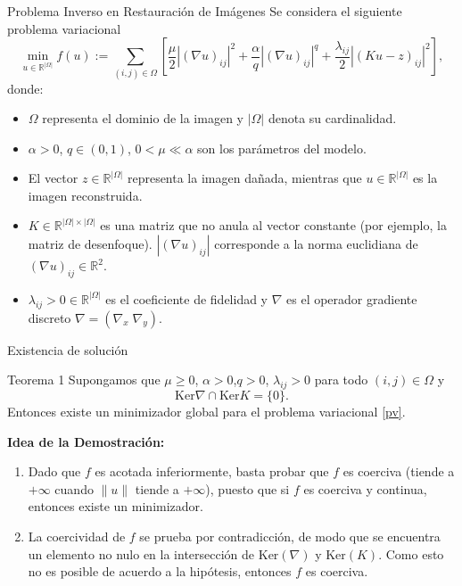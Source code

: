 \documentclass[aspectratio=169,11pt]{beamer}
\begin{document}
\begin{frame}{Problema Inverso en Restauración de Imágenes}
   Se considera el siguiente problema variacional 
    \begin{equation}
        \min_{u \in \mathbb{R}^{|\Omega|}} f(u) := \sum_{(i,j) \in \Omega} \left[ \frac{\mu}{2} |(\nabla u)_{ij}|^2 + \frac{\alpha}{q} |(\nabla u)_{ij}|^q + \frac{\lambda_{ij}}{2} |(Ku - z)_{ij}|^2 \right],
        \label{pv}
    \end{equation}
    donde:
    \begin{itemize}
        \item $\Omega$ representa el dominio de la imagen y $|\Omega|$ denota su cardinalidad.
        \item $\alpha>0$, $q\in (0,1)$, $0<\mu\ll \alpha$ son los parámetros del modelo. 
        \item El vector $z \in \mathbb{R}^{|\Omega|}$ representa la imagen dañada, mientras que $u\in\mathbb{R}^{|\Omega|}$ es la imagen reconstruida.
        \item $K \in \mathbb{R}^{|\Omega| \times |\Omega|}$ es una matriz que no anula al vector constante (por ejemplo, la matriz de desenfoque). $|(\nabla u)_{ij}|$ corresponde a la norma euclidiana de $(\nabla u)_{ij}\in \mathbb{R}^2.$
        \item $\lambda_{ij}>0\in \mathbb{R}^{|\Omega|}$ es el coeficiente de fidelidad y $\nabla$ es el operador gradiente discreto $\nabla=(\nabla_x\;\nabla_y).$
    \end{itemize}
\end{frame}

\begin{frame}{Existencia de solución}
\begin{block}{Teorema 1}
    Supongamos que $\mu\geq 0$, $\alpha>0$,$q>0$, $\lambda_{ij}>0$ para todo $(i,j)\in\Omega$ y 
    $$
    \mathrm{Ker}\nabla \cap \mathrm{Ker} K=\{0\}.
    $$
    Entonces existe un minimizador global para el problema variacional \eqref{pv}.
\end{block}

\textbf{Idea de la Demostración:}
    \begin{enumerate}
        \item Dado que $f$ es acotada inferiormente, basta probar que $f$ es coerciva (tiende a $+\infty$ cuando $\|u\|$ tiende a $+\infty$), puesto que si $f$ es coerciva y continua, entonces existe un minimizador. 
        \item La coercividad de $f$ se prueba por contradicción, de modo que se encuentra un elemento no nulo en la intersección de $\mathrm{Ker}(\nabla)$ y $\mathrm{Ker}(K)$. Como esto no es posible de acuerdo a la hipótesis, entonces $f$ es coerciva. 
    \end{enumerate}
\end{frame}
\end{document}
